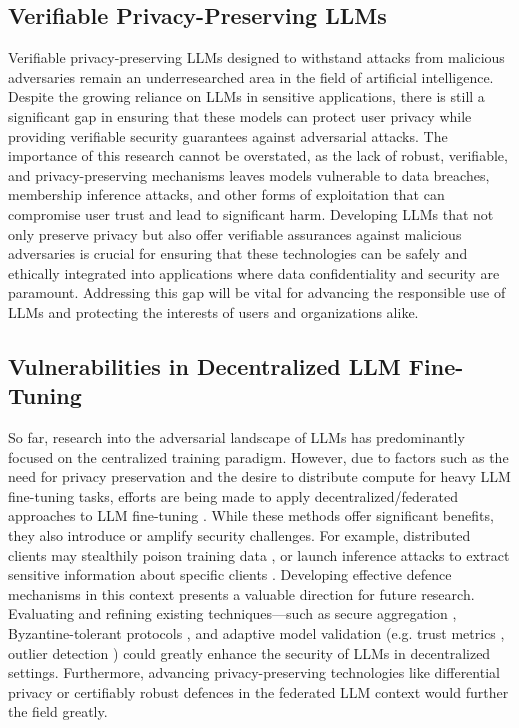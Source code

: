\subsection{Verifiable Privacy-Preserving LLMs}

Verifiable privacy-preserving LLMs designed to withstand attacks from malicious adversaries remain an underresearched area in the field of artificial intelligence. Despite the growing reliance on LLMs in sensitive applications, there is still a significant gap in ensuring that these models can protect user privacy while providing verifiable security guarantees against adversarial attacks. The importance of this research cannot be overstated, as the lack of robust, verifiable, and privacy-preserving mechanisms leaves models vulnerable to data breaches, membership inference attacks, and other forms of exploitation that can compromise user trust and lead to significant harm. Developing LLMs that not only preserve privacy but also offer verifiable assurances against malicious adversaries is crucial for ensuring that these technologies can be safely and ethically integrated into applications where data confidentiality and security are paramount. Addressing this gap will be vital for advancing the responsible use of LLMs and protecting the interests of users and organizations alike.

\subsection{Vulnerabilities in Decentralized LLM Fine-Tuning} 

So far, research into the adversarial landscape of LLMs has predominantly focused on the centralized training paradigm. However, due to factors such as the need for privacy preservation and the desire to distribute compute for heavy LLM fine-tuning tasks, efforts are being made to apply decentralized/federated approaches to LLM fine-tuning \cite{kuang_2024a}. While these methods offer significant benefits, they also introduce or amplify security challenges. For example, distributed clients may stealthily poison training data \cite{bagdasaryan_2020a,wang_2020b,xie_2020a}, or launch inference attacks to extract sensitive information about specific clients \cite{nasr_2019a}. Developing effective defence mechanisms in this context presents a valuable direction for future research. Evaluating and refining existing techniques—such as secure aggregation \cite{bonawitz_2017a}, Byzantine-tolerant protocols \cite{blanchard_2017a,mhamdi_2018a}, and adaptive model validation (e.g. trust metrics \cite{cao_2021a}, outlier detection \cite{nguyen_2022a}) could greatly enhance the security of LLMs in decentralized settings. Furthermore, advancing privacy-preserving technologies like differential privacy \cite{dwork_2006a} or certifiably robust defences \cite{xie_2021a} in the federated LLM context would further the field greatly.

